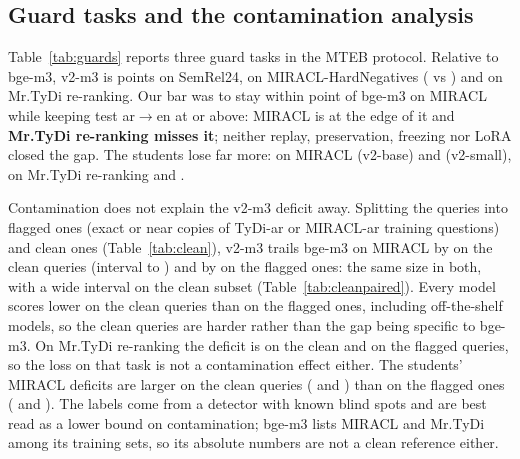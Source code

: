 \documentclass[11pt]{article}
\newcommand{\tabfont}{\footnotesize\setlength{\tabcolsep}{3.2pt}}
\newcommand{\ardir}{ar$\to$en}
\begin{document}
\begin{table}[t]
\centering\tabfont

\caption{MTEB(ara, v1), scores $\times100$, sorted by Mean (Task). Task = mean over tasks, Type = mean over task types; ar / ar-en = mean over Arabic-only / Arabic--English subsets. Bold: v2 models and the best value of each column.}\label{tab:mteb}
\end{table}

\begin{table}[t]
\centering\tabfont
{}
\caption{Paired uncertainty of MTEB(ara) mean differences: bootstrap over tasks, wins / losses / ties (a tie is a difference below half a hundredth of a point), exact two-sided sign test. Subset rows use only the tasks that have such subsets. The lower block compares baseline models, for scale.}\label{tab:paired}
\end{table}

\subsection{Guard tasks and the contamination analysis}
Table~\ref{tab:guards} reports three guard tasks in the MTEB protocol.
Relative to bge-m3, v2-m3 is \NumGuardGapSemRel{} points on SemRel24, \NumGuardGapMiracl{} on MIRACL-HardNegatives (\NumGuardVTwoMMiracl{} vs \NumGuardBgeMiracl) and \NumGuardGapNamaa{} on Mr.TyDi re-ranking.
Our bar was to stay within \NumGuardBar{} point of bge-m3 on MIRACL while keeping test \ardir{} at \NumGuardBarArEn{} or above: MIRACL is at the edge of it and \textbf{Mr.TyDi re-ranking misses it}; neither replay, preservation, freezing nor LoRA closed the gap.
The students lose far more: on MIRACL \NumGuardBGapMiracl{} (v2-base) and \NumGuardSGapMiracl{} (v2-small), on Mr.TyDi re-ranking \NumGuardBGapNamaa{} and \NumGuardSGapNamaa{}.

Contamination does not explain the v2-m3 deficit away.
Splitting the queries into flagged ones (exact or near copies of TyDi-ar or MIRACL-ar training questions) and clean ones (Table~\ref{tab:clean}), v2-m3 trails bge-m3 on MIRACL by \NumSplitCleanGapMiracl{} on the \NumMiraclCleanN{} clean queries (interval \NumSplitCleanGapLoMiracl{} to \NumSplitCleanGapHiMiracl) and by \NumSplitFlagGapMiracl{} on the \NumMiraclFlagged{} flagged ones: the same size in both, with a wide interval on the clean subset (Table~\ref{tab:cleanpaired}).
Every model scores lower on the clean queries than on the flagged ones, including off-the-shelf models, so the clean queries are harder rather than the gap being specific to bge-m3.
On Mr.TyDi re-ranking the deficit is \NumSplitCleanGapNamaa{} on the clean and \NumSplitFlagGapNamaa{} on the \NumNamaaFlagged{} flagged queries, so the loss on that task is not a contamination effect either.
The students' MIRACL deficits are larger on the clean queries (\NumSplitCleanGapBMiracl{} and \NumSplitCleanGapSMiracl) than on the flagged ones (\NumSplitFlagGapBMiracl{} and \NumSplitFlagGapSMiracl).
The labels come from a detector with known blind spots and are best read as a lower bound on contamination; bge-m3 lists MIRACL and Mr.TyDi among its training sets, so its absolute numbers are not a clean reference either. \TodoCleanProtocol{}
\end{document}

